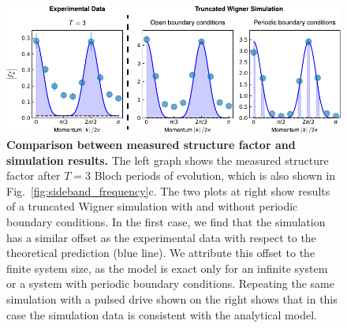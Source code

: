 \documentclass[aps,pra,superscriptaddress,12pt]{revtex4-1} %
\begin{document}
\newpage
\begin{figure}[h]
    \centering
    \includegraphics{Figures/ExtData3.pdf}
    \caption{\textbf{Comparison between measured structure factor and simulation results.} The left graph shows the measured structure factor after $T=3$ Bloch periods of evolution, which is also shown in Fig.~\ref{fig:sideband_frequency}c. The two plots at right show results of a truncated Wigner simulation with and without periodic boundary conditions. In the first case, we find that the simulation has a similar offset as the experimental data with respect to the theoretical prediction (blue line). We attribute this offset to the finite system size, as the model is exact only for an infinite system or a system with periodic boundary conditions. Repeating the same simulation with a pulsed drive shown on the right shows that in this case the simulation data is consistent with the analytical model.}
    \label{ExtFig:Comp_Sim_Data}
\end{figure}
\clearpage
{}


\end{document}
